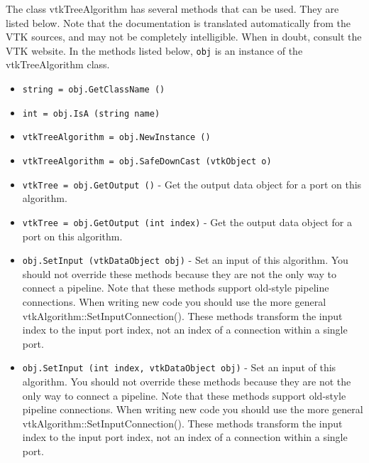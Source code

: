 The class vtkTreeAlgorithm has several methods that can be used.
  They are listed below.
Note that the documentation is translated automatically from the VTK sources,
and may not be completely intelligible.  When in doubt, consult the VTK website.
In the methods listed below, \verb|obj| is an instance of the vtkTreeAlgorithm class.
\begin{itemize}
\item  \verb|string = obj.GetClassName ()|

\item  \verb|int = obj.IsA (string name)|

\item  \verb|vtkTreeAlgorithm = obj.NewInstance ()|

\item  \verb|vtkTreeAlgorithm = obj.SafeDownCast (vtkObject o)|

\item  \verb|vtkTree = obj.GetOutput ()| -  Get the output data object for a port on this algorithm.

\item  \verb|vtkTree = obj.GetOutput (int index)| -  Get the output data object for a port on this algorithm.

\item  \verb|obj.SetInput (vtkDataObject obj)| -  Set an input of this algorithm. You should not override these
 methods because they are not the only way to connect a pipeline.
 Note that these methods support old-style pipeline connections.
 When writing new code you should use the more general
 vtkAlgorithm::SetInputConnection().  These methods transform the
 input index to the input port index, not an index of a connection
 within a single port.

\item  \verb|obj.SetInput (int index, vtkDataObject obj)| -  Set an input of this algorithm. You should not override these
 methods because they are not the only way to connect a pipeline.
 Note that these methods support old-style pipeline connections.
 When writing new code you should use the more general
 vtkAlgorithm::SetInputConnection().  These methods transform the
 input index to the input port index, not an index of a connection
 within a single port.

\end{itemize}
